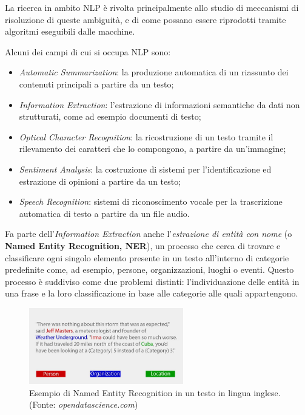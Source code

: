 \documentclass[a4paper,11pt]{article}
\begin{document}
La ricerca in ambito NLP è rivolta principalmente allo studio di meccanismi di risoluzione di queste ambiguità, e di come possano essere riprodotti tramite algoritmi eseguibili dalle macchine.

Alcuni dei campi di cui si occupa NLP sono: 
\begin{itemize}
	\item \textit{Automatic Summarization}: la produzione automatica di un riassunto dei contenuti principali a partire da un testo;
	\item \textit{Information Extraction}: l'estrazione di informazioni semantiche da dati non strutturati, come ad esempio documenti di testo;
	\item \textit{Optical Character Recognition}: la ricostruzione di un testo tramite il rilevamento dei caratteri che lo compongono, a partire da un’immagine;
	\item \textit{Sentiment Analysis}: la costruzione di sistemi per l'identificazione ed estrazione di opinioni a partire da un testo;
	\item \textit{Speech Recognition}: sistemi di riconoscimento vocale per la trascrizione automatica di testo a partire da un file audio.
\end{itemize}

Fa parte dell'\textit{Information Extraction} anche l'\textit{estrazione di entità con nome} (o \textbf{Named Entity Recognition, NER}), un processo che cerca di trovare e classificare ogni singolo elemento presente in un testo all’interno di categorie predefinite come, ad esempio, persone, organizzazioni, luoghi o eventi. Questo processo è suddiviso come due problemi distinti: l'individuazione delle entità in una frase e la loro classificazione in base alle categorie alle quali appartengono. \cite{wiki:ner}

\begin{figure}[H]
\centering
\includegraphics[width=0.6\textwidth]{img/ner}
\caption{Esempio di Named Entity Recognition in un testo in lingua inglese. (Fonte: \textit{opendatascience.com})}
\label{fig:results-it}
\end{figure}
\end{document}
